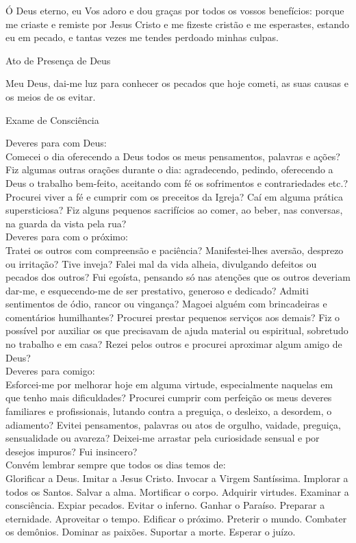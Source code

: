 \documentclass{book}
\begin{document}
\begin{flushleft}
    Ó Deus eterno, eu Vos adoro e dou graças por todos os vossos benefícios: porque me criaste e remiste por Jesus Cristo e me fizeste cristão e me esperastes, estando eu em pecado, e tantas vezes me tendes perdoado minhas culpas.
\end{flushleft}
\begin{center}
    Ato de Presença de Deus
\end{center}
\begin{flushleft}
    Meu Deus, dai-me luz para conhecer os pecados que hoje cometi, as suas causas e os meios de os evitar.
\end{flushleft}
\begin{center}
    Exame de Consciência
\end{center}
\begin{flushleft}
    Deveres para com Deus: \\ Comecei o dia oferecendo a Deus todos os meus pensamentos, palavras e ações? Fiz algumas outras orações durante o dia: agradecendo, pedindo, oferecendo a Deus o trabalho bem-feito, aceitando com fé os sofrimentos e contrariedades etc.? Procurei viver a fé e cumprir com os preceitos da Igreja? Caí em alguma prática supersticiosa? Fiz alguns pequenos sacrifícios ao comer, ao beber, nas conversas, na guarda da vista pela rua? \\
    \hfill{} \break{}
    Deveres para com o próximo: \\ Tratei os outros com compreensão e paciência? Manifestei-lhes aversão, desprezo ou irritação? Tive inveja? Falei mal da vida alheia, divulgando defeitos ou pecados dos outros? Fui egoísta, pensando só nas atenções que os outros deveriam dar-me, e esquecendo-me de ser prestativo, generoso e dedicado? Admiti sentimentos de ódio, rancor ou vingança? Magoei alguém com brincadeiras e comentários humilhantes? Procurei prestar pequenos serviços aos demais? Fiz o possível por auxiliar os que precisavam de ajuda material ou espiritual, sobretudo no trabalho e em casa? Rezei pelos outros e procurei aproximar algum amigo de Deus? \\
    \newpage
    Deveres para comigo: \\ Esforcei-me por melhorar hoje em alguma virtude, especialmente naquelas em que tenho mais dificuldades? Procurei cumprir com perfeição os meus deveres familiares e profissionais, lutando contra a preguiça, o desleixo, a desordem, o adiamento? Evitei pensamentos, palavras ou atos de orgulho, vaidade, preguiça, sensualidade ou avareza? Deixei-me arrastar pela curiosidade sensual e por desejos impuros? Fui insincero? \\
    \hfill{} \break{}
    Convém lembrar sempre que todos os dias temos de: \\ Glorificar a Deus. Imitar a Jesus Cristo. Invocar a Virgem Santíssima. Implorar a todos os Santos. Salvar a alma. Mortificar o corpo. Adquirir virtudes. Examinar a consciência. Expiar pecados. Evitar o inferno. Ganhar o Paraíso. Preparar a eternidade. Aproveitar o tempo. Edificar o próximo. Preterir o mundo. Combater os demônios. Dominar as paixões. Suportar a morte. Esperar o juízo.
\end{flushleft}
\end{document}
